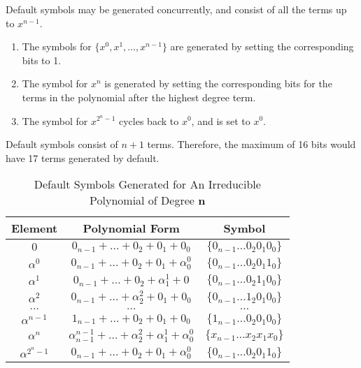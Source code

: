 \documentclass[paper=usletter, fontsize=12pt]{article}
\begin{document}
            Default symbols may be generated concurrently, and consist of all the terms up to $x^{n-1}$.

            \begin{enumerate}
                \item The symbols for $\{x^{0}, x^{1}, \ldots, x^{n-1}\}$ are generated by setting the corresponding bits to 1.
                \item The symbol for $x^{n}$ is generated by setting the corresponding bits for the terms in the polynomial after the highest degree term.
                \item The symbol for $x^{2^{n}-1}$ cycles back to $x^{0}$, and is set to $x^{0}$.
            \end{enumerate}

            Default symbols consist of $n+1$ terms. Therefore, the maximum of 16 bits would have 17 terms generated by default.

           \begin{table}[h]
                \def\arraystretch{2.5}
                \caption{Default Symbols Generated for An Irreducible Polynomial of Degree $\bm{n}$}
                \centering
                \begin{tabular*}{300pt}{@{\extracolsep{\fill}} ccc}

                \textbf{Element} & \textbf{Polynomial Form} & \textbf{Symbol} \\
                \hline
                $0$                 & $0_{n-1} + \ldots + 0_{2} + 0_{1} + 0_{0}$                                           & $\{0_{n-1}\ldots0_{2}0_{1}0_{0}\}$  \\
                $\alpha^{0}$        & $0_{n-1} + \ldots + 0_{2} + 0_{1} + \alpha^{0}_{0}$                                  & $\{0_{n-1}\ldots0_{2}0_{1}1_{0}\}$ \\
                $\alpha^{1}$        & $0_{n-1} + \ldots + 0_{2} + \alpha^{1}_{1} + 0$                                      & $\{0_{n-1}\ldots0_{2}1_{1}0_{0}\}$ \\
                $\alpha^{2}$        & $0_{n-1} + \ldots + \alpha^{2}_{2} + 0_{1} + 0_{0}$                                  & $\{0_{n-1}\ldots1_{2}0_{1}0_{0}\}$ \\
                $\ldots$            & $\ldots$                                                                             & $\ldots$ \\
                $\alpha^{n-1}$      & $1_{n-1} + \ldots + 0_{2} + 0_{1} + 0_{0}$                                           & $\{1_{n-1}\ldots 0_{2}0_{1}0_{0}\}$ \\
                $\alpha^{n}$        & $\alpha^{n-1}_{n-1} + \ldots + \alpha^{2}_{2} + \alpha^{1}_{1} + \alpha^{0}_{0}$     & $\{x_{n-1}\ldots x_{2}x_{1}x_{0}\}$ \\
                $\alpha^{2^{n}-1}$  & $0_{n-1} + \ldots + 0_{2} + 0_{1} + \alpha^{0}_{0}$                                  & $\{0_{n-1}\ldots0_{2}0_{1}1_{0}\}$ \\
                \end{tabular*}
            \end{table}
            \newpage
\end{document}
